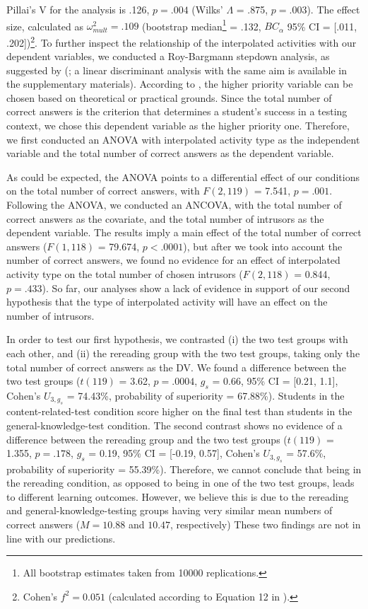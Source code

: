 \documentclass[
  11pt,
]{article}
\begin{document}
Pillai's V for the analysis is .126, \(p = .004\) (Wilks' \(\Lambda\) =
.875, \(p = .003\)). The effect size, calculated as
\(\omega^2_{mult} = .109\) (bootstrap
median\footnote{All bootstrap estimates taken from 10000 replications.}
= .132, \(BC_\alpha\) 95\% CI = {[}.011, .202{]})\footnote{
Cohen's \(f^2 = 0.051\) (calculated according to Equation 12 in
\citealp{steynjrEstimatingEffectSize2009}).
}. To further inspect the relationship of the interpolated activities
with our dependent variables, we conducted a Roy-Bargmann stepdown
analysis, as suggested by
\citeauthor{tabachnickUsingMultivariateStatistics2012}
(\citeyear{tabachnickUsingMultivariateStatistics2012}; a linear
discriminant analysis with the same aim is available in the
supplementary materials). According to
\citet{tabachnickUsingMultivariateStatistics2012}, the higher priority
variable can be chosen based on theoretical or practical grounds. Since
the total number of correct answers is the criterion that determines a
student's success in a testing context, we chose this dependent variable
as the higher priority one. Therefore, we first conducted an ANOVA with
interpolated activity type as the independent variable and the total
number of correct answers as the dependent variable.

As could be expected, the ANOVA points to a differential effect of our
conditions on the total number of correct answers, with \(F(2, 119)\) =
7.541, \(p = .001\). Following the ANOVA, we conducted an ANCOVA, with
the total number of correct answers as the covariate, and the total
number of intrusors as the dependent variable. The results imply a main
effect of the total number of correct answers (\(F(1, 118)\) = 79.674,
\(p < .0001\)), but after we took into account the number of correct
answers, we found no evidence for an effect of interpolated activity
type on the total number of chosen intrusors (\(F (2, 118)\) = 0.844,
\(p = .433\)). So far, our analyses show a lack of evidence in support
of our second hypothesis that the type of interpolated activity will
have an effect on the number of intrusors.

In order to test our first hypothesis, we contrasted (i) the two test
groups with each other, and (ii) the rereading group with the two test
groups, taking only the total number of correct answers as the DV. We
found a difference between the two test groups (\(t(119)\) = 3.62,
\(p = .0004\), \(g_s\) = 0.66, 95\% CI = {[}0.21, 1.1{]}, Cohen's
\(U_{3, g_s}\) = 74.43\%, probability of superiority = 67.88\%).
Students in the content-related-test condition score higher on the final
test than students in the general-knowledge-test condition. The second
contrast shows no evidence of a difference between the rereading group
and the two test groups (\(t(119)\) = 1.355, \(p = .178\), \(g_s\) =
0.19, 95\% CI = {[}-0.19, 0.57{]}, Cohen's \(U_{3, g_s}\) = 57.6\%,
probability of superiority = 55.39\%). Therefore, we cannot conclude
that being in the rereading condition, as opposed to being in one of the
two test groups, leads to different learning outcomes. However, we
believe this is due to the rereading and general-knowledge-testing
groups having very similar mean numbers of correct answers
(\(M = 10.88\) and \(10.47\), respectively) These two findings are not
in line with our predictions.
\end{document}

